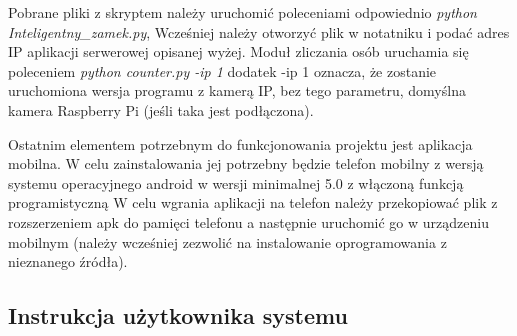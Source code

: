 Pobrane pliki z skryptem należy uruchomić poleceniami odpowiednio \textit{python Inteligentny\_zamek.py}, Wcześniej należy otworzyć plik w notatniku i podać adres IP aplikacji serwerowej opisanej wyżej. Moduł zliczania osób uruchamia się poleceniem \textit{python counter.py -ip 1} dodatek -ip 1 oznacza, że zostanie uruchomiona wersja programu z kamerą IP, bez tego parametru, domyślna kamera Raspberry Pi (jeśli taka jest podłączona).

Ostatnim elementem potrzebnym do funkcjonowania projektu jest aplikacja mobilna. W celu zainstalowania jej potrzebny będzie telefon mobilny z wersją systemu operacyjnego android w wersji minimalnej 5.0 z włączoną funkcją programistyczną  W celu wgrania aplikacji na telefon należy przekopiować plik z rozszerzeniem apk do pamięci telefonu a następnie uruchomić go w urządzeniu mobilnym (należy wcześniej zezwolić na instalowanie oprogramowania z nieznanego źródła).
 
\subsection*{Instrukcja użytkownika systemu \NazwaSys}

